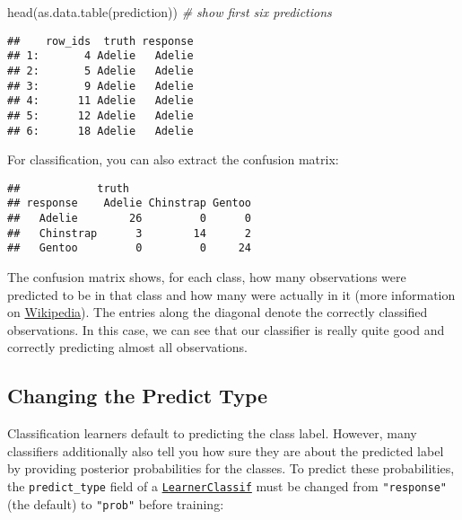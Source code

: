 \documentclass[
]{scrbook}
\newenvironment{Shaded}{\begin{snugshade}}{\end{snugshade}}
\newcommand{\CommentTok}[1]{\textcolor[rgb]{0.56,0.35,0.01}{\textit{#1}}}
\newcommand{\FunctionTok}[1]{\textcolor[rgb]{0.00,0.00,0.00}{#1}}
\newcommand{\NormalTok}[1]{#1}
\newcommand{\SpecialCharTok}[1]{\textcolor[rgb]{0.00,0.00,0.00}{#1}}
\renewenvironment{Shaded} {\begin{snugshade}\small} {\end{snugshade}}
\begin{document}
\begin{Shaded}
\begin{Highlighting}[]
\FunctionTok{head}\NormalTok{(}\FunctionTok{as.data.table}\NormalTok{(prediction)) }\CommentTok{\# show first six predictions}
\end{Highlighting}
\end{Shaded}

\begin{verbatim}
##    row_ids  truth response
## 1:       4 Adelie   Adelie
## 2:       5 Adelie   Adelie
## 3:       9 Adelie   Adelie
## 4:      11 Adelie   Adelie
## 5:      12 Adelie   Adelie
## 6:      18 Adelie   Adelie
\end{verbatim}

For classification, you can also extract the confusion matrix:

\begin{Shaded}
\end{Shaded}

\begin{verbatim}
##            truth
## response    Adelie Chinstrap Gentoo
##   Adelie        26         0      0
##   Chinstrap      3        14      2
##   Gentoo         0         0     24
\end{verbatim}

The confusion matrix shows, for each class, how many observations were predicted to be in that class and how many were actually in it (more information on \href{https://en.wikipedia.org/wiki/Confusion_matrix}{Wikipedia}).
The entries along the diagonal denote the correctly classified observations.
In this case, we can see that our classifier is really quite good and correctly predicting almost all observations.

\hypertarget{predict-type}{%
\subsection{Changing the Predict Type}\label{predict-type}}

Classification learners default to predicting the class label.
However, many classifiers additionally also tell you how sure they are about the predicted label by providing posterior probabilities for the classes.
To predict these probabilities, the \texttt{predict\_type} field of a \href{https://mlr3.mlr-org.com/reference/LearnerClassif.html}{\texttt{LearnerClassif}} must be changed from \texttt{"response"} (the default) to \texttt{"prob"} before training:
\end{document}
